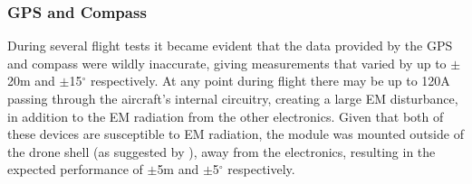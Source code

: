 \subsubsection*{GPS and Compass}  
During several flight tests it became evident that the data provided by the GPS and compass were wildly inaccurate, giving measurements that varied by up to $\pm$20m and $\pm$15$^\circ$ respectively. At any point during flight there may be up to 120A passing through the aircraft's internal circuitry, creating a large EM disturbance, in addition to the EM radiation from the other electronics. Given that both of these devices are susceptible to EM radiation\cite{ref:gpsinterference}, the module was mounted outside of the drone shell (as suggested by \cite{ref:gpsposition}), away from the electronics, resulting in the expected performance of $\pm$5m and $\pm$5$^\circ$ respectively.